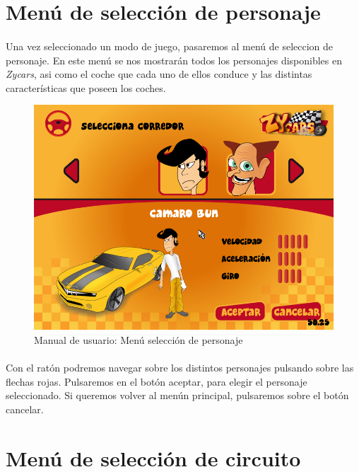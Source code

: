 \section{Menú de selección de personaje}

\paragraph{}
Una vez seleccionado un modo de juego, pasaremos al menú de seleccion de personaje. En este menú se nos mostrarán todos
los personajes disponibles en \emph{Zycars}, asi como el coche que cada uno de ellos conduce y las distintas características
que poseen los coches.

\begin{figure}[H]
  \label{menu_personaje}
  \begin{center}
    \includegraphics[scale=0.4]{imagenes/capturas/seleccionpersonaje.png}
  \end{center}
  \caption{Manual de usuario: Menú selección de personaje}
\end{figure}

\paragraph{}
Con el ratón podremos navegar sobre los distintos personajes pulsando sobre las flechas rojas. Pulsaremos en el botón
aceptar, para elegir el personaje seleccionado. Si queremos volver al menún principal, pulsaremos sobre el botón cancelar.

\section{Menú de selección de circuito}

